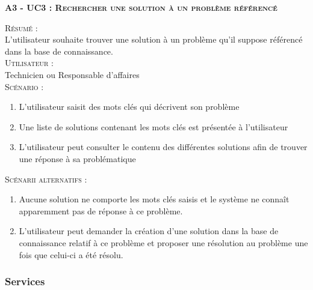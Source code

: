 \noindent\textsc{\bf{A3 - UC3 :} Rechercher une solution à un problème référencé}
\begin{shaded}
\noindent\textsc{Résumé :}\\

L’utilisateur souhaite trouver une solution à un problème qu’il suppose référencé dans la base de connaissance. \\

\noindent\textsc{Utilisateur :} \\

Technicien ou Responsable d’affaires \\

\noindent\textsc{Scénario :} \\
\begin{enumerate}
    \item L’utilisateur saisit des mots clés qui décrivent son problème
    \item Une liste de solutions contenant les mots clés est présentée à l’utilisateur
    \item L’utilisateur peut consulter le contenu des différentes solutions afin de trouver une réponse à sa problématique \\
\end{enumerate}
\noindent\textsc{Scénarii alternatifs :}\\
\begin{enumerate}
    \item Aucune solution ne comporte les mots clés saisis et le système ne connaît apparemment pas de réponse à ce problème.
    \item L’utilisateur peut demander la création d’une solution dans la base de connaissance relatif à ce problème et proposer une résolution au problème une fois que celui-ci a été résolu.
\end{enumerate}
\end{shaded}

\subsubsection{Services}

